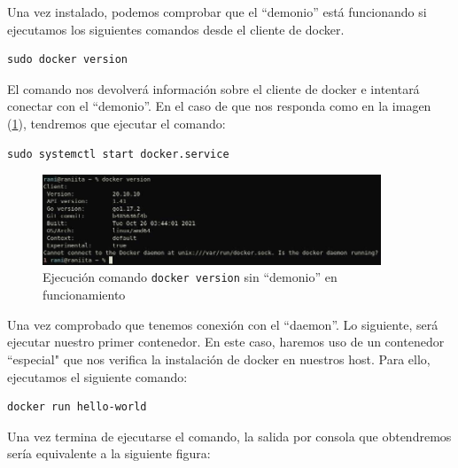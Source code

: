 \documentclass[12pt]{article}
\begin{document}
	\noindent Una vez instalado, podemos comprobar que el ``demonio'' está funcionando si ejecutamos los siguientes comandos desde el cliente de docker.
	\begin{verbatim}
sudo docker version
	\end{verbatim}

	\noindent El comando nos devolverá información sobre el cliente de docker e intentará conectar con el ``demonio''. En el caso de que nos responda como en la imagen (\ref{img: docker version}), tendremos que ejecutar el comando:
	\begin{verbatim}
sudo systemctl start docker.service
	\end{verbatim}
	
	\begin{figure}[h]
		\begin{center}
			\includegraphics[width=0.9\textwidth]{img/docker_version.jpg}
			\caption{Ejecución comando \texttt{docker version} sin ``demonio'' en funcionamiento}
			\label{img: docker version}
		\end{center}
	\end{figure}

	\pagebreak
	
	\noindent Una vez comprobado que tenemos conexión con el ``daemon''. Lo siguiente, será ejecutar nuestro primer contenedor. En este caso, haremos uso de un contenedor ``especial" que nos verifica la instalación de docker en nuestros host. Para ello, ejecutamos el siguiente comando:
	\begin{verbatim}
docker run hello-world
	\end{verbatim}

	\noindent Una vez termina de ejecutarse el comando, la salida por consola que obtendremos sería equivalente a la siguiente figura:
	
\end{document}
